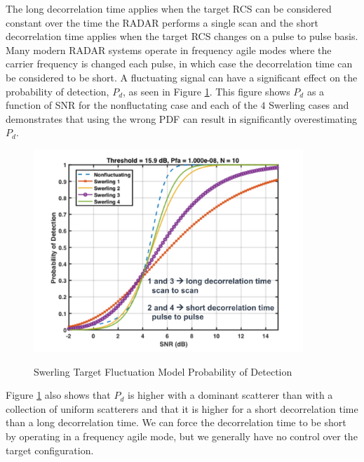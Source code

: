 The long decorrelation time applies when the target RCS can be considered constant over the time the RADAR performs a single scan and the short decorrelation time applies when the target RCS changes on a pulse to pulse basis. Many modern RADAR systems operate in frequency agile modes where the carrier frequency is changed each pulse, in which case the decorrelation time can be considered to be short. A fluctuating signal can have a significant effect on the probability of detection, $P_d$, as seen in Figure \ref{env_fig:5}. This figure shows $P_d$ as a function of SNR for the nonfluctating case and each of the $4$ Swerling cases and demonstrates that using the wrong PDF can result in significantly overestimating $P_d$.

\begin{figure}[H]
  \begin{center}
\includegraphics[width=4in]{../media/multistatic/swerling_pd.png}
  \end{center}
  \renewcommand{\baselinestretch}{1} \small\normalsize
  \begin{quote}
    \caption[Swerling Target Fluctuation Model Probability of Detection]{Swerling Target Fluctuation Model Probability of Detection\label{env_fig:5}}
  \end{quote}
\end{figure}
\renewcommand{\baselinestretch}{2} \small\normalsize

Figure \ref{env_fig:5} also shows that $P_d$ is higher with a dominant scatterer than with a collection of uniform scatterers and that it is higher for a short decorrelation time than a long decorrelation time. We can force the decorrelation time to be short by operating in a frequency agile mode, but we generally have no control over the target configuration.

